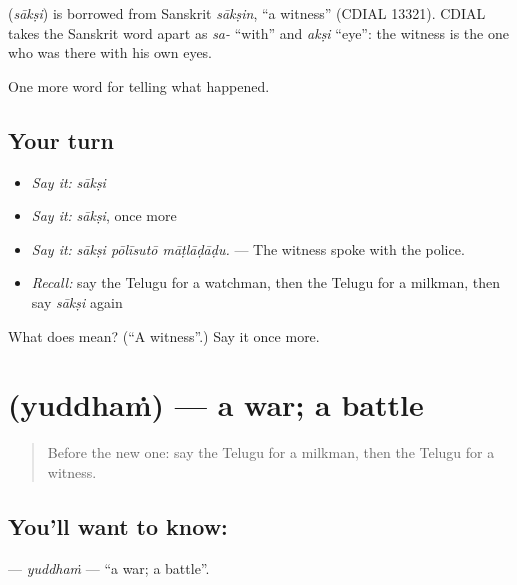 \begin{cousinweb}
\textbf{} (\emph{sākṣi}) is borrowed from Sanskrit \emph{sākṣin}, \textquotedblleft{}a witness\textquotedblright{} (CDIAL 13321). CDIAL takes the Sanskrit word apart as \emph{sa-} \textquotedblleft{}with\textquotedblright{} and \emph{akṣi} \textquotedblleft{}eye\textquotedblright{}: the witness is the one who was there with his own eyes.
\end{cousinweb}

\begin{grammarlens}[title={What you've built}]
One more word for telling what happened.
\end{grammarlens}

\subsection*{Your turn}
\begin{itemize}
\raggedright
  \item \emph{Say it:} \emph{sākṣi}
  \item \emph{Say it:} \emph{sākṣi}, once more
  \item \emph{Say it:} \emph{sākṣi pōlīsutō māṭlāḍāḍu.} — The witness spoke with the police.
  \item \emph{Recall:} say the Telugu for a watchman, then the Telugu for a milkman, then say \emph{sākṣi} again
\end{itemize}

\begin{tcolorbox}[breakable,colback=teal!4,colframe=teal!35!black,title={Before you move on}]
What does  mean? (\textquotedblleft{}A witness\textquotedblright{}.) Say it once more.
\end{tcolorbox}
\section[\texorpdfstring{\te{యుద్ధం} (yuddhaṁ)}{యుద్ధం (yuddhaṁ)}]{ (yuddhaṁ) — a war; a battle}

\label{lesson:TE-C326-yuddham}



\begin{quote}
Before the new one: say the Telugu for a milkman, then the Telugu for a witness.
\end{quote}

\subsection*{You'll want to know: }
\textbf{} — \emph{yuddhaṁ} — \textquotedblleft{}a war; a battle\textquotedblright{}.

